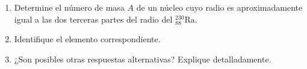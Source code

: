 \item \begin{enumerate}
    \item Determine el número de masa $A$ de un núcleo cuyo radio es aproximadamente igual a las dos terceras partes del radio del $^{230}_{88}\text{Ra}$.
    \item Identifique el elemento correspondiente.
    \item ¿Son posibles otras respuestas alternativas? Explique detalladamente.
\end{enumerate}